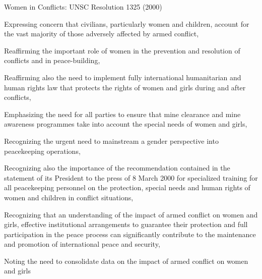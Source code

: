 \documentclass[handout]{beamer}
\begin{document}
\begin{frame}{Women in Conflicts: UNSC Resolution 1325 (2000)}
\begin{itemize}
    {\scriptsize
    \pause\item Expressing concern that civilians, particularly women and children, account for the vast majority of those adversely affected by armed conflict,
    \pause\item Reaffirming the important role of women in the prevention and resolution of conflicts and in peace-building,
    \pause\item Reaffirming also the need to implement fully international humanitarian and human rights law that protects the rights of women and girls during and after conflicts,
    \pause\item Emphasizing the need for all parties to ensure that mine clearance and mine awareness programmes take into account the special needs of women and girls,
    \pause\item Recognizing the urgent need to mainstream a gender perspective into peacekeeping operations,
    \pause\item Recognizing also the importance of the recommendation contained in the statement of its President to the press of 8 March 2000 for specialized training for all peacekeeping personnel on the protection, special needs and human rights of women and children in conflict situations,
    \pause\item Recognizing that an understanding of the impact of armed conflict on women and girls, effective institutional arrangements to guarantee their protection and full participation in the peace process can significantly contribute to the maintenance and promotion of international peace and security,
    \pause\item Noting the need to consolidate data on the impact of armed conflict on women and girls
    }
\end{itemize}
\end{frame}
\end{document}
